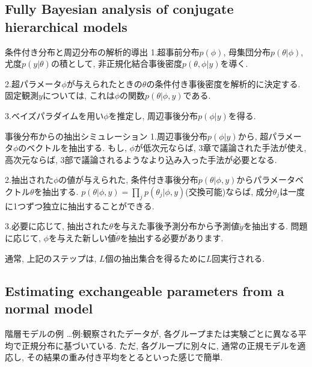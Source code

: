 \documentclass[11pt,a4pape,dvipdfmx]{jarticle}
\begin{document}
\subsection{Fully Bayesian analysis of conjugate hierarchical models}
\begin{itembox}[l]{条件付き分布と周辺分布の解析的導出}
1.超事前分布$p(\phi)$, 母集団分布$p(\theta|\phi)$, 尤度$p(y|\theta)$の積として, 非正規化結合事後密度$p(\theta,\phi|y)$を導く.

2.超パラメータ$\phi$が与えられたときの$\theta$の条件付き事後密度を解析的に決定する.
固定観測$y$については, これは$\phi$の関数$p(\theta|\phi, y)$である.

3.ベイズパラダイムを用い$\phi$を推定し, 周辺事後分布$p(\phi|y)$を得る.
\end{itembox}



\begin{itembox}[l]{事後分布からの抽出シミュレーション}
1.周辺事後分布$p(\phi|y)$から, 超パラメータ$\phi$のベクトルを抽出する.
もし, $\phi$が低次元ならば, 3章で議論された手法が使え, 高次元ならば, 3部で議論されるようなより込み入った手法が必要となる.

2.抽出された$\phi$の値が与えられた, 条件付き事後分布$p(\theta|\phi,y)$からパラメータベクトル$\theta$を抽出する.
$p(\theta|\phi, y)=\prod_j p(\theta_j|\phi,y)$(交換可能)ならば, 成分$\theta_j$は一度に1つずつ独立に抽出することができる.

3.必要に応じて, 抽出された$\theta$を与えた事後予測分布から予測値$\tilde{y}$を抽出する.
問題に応じて, $\phi$を与えた新しい値$\tilde{\theta}$を抽出する必要があります.

通常, 上記のステップは, $L$個の抽出集合を得るために$L$回実行される.
\end{itembox}




\subsection{Estimating exchangeable parameters from a normal model}
\begin{itembox}[l]{階層モデルの例}
…例:観察されたデータが, 各グループまたは実験ごとに異なる平均で正規分布に基づいている.
ただ, 各グループに別々に, 通常の正規モデルを適応し, その結果の重み付き平均をとるといった感じで簡単.
\end{itembox}
\end{document}
